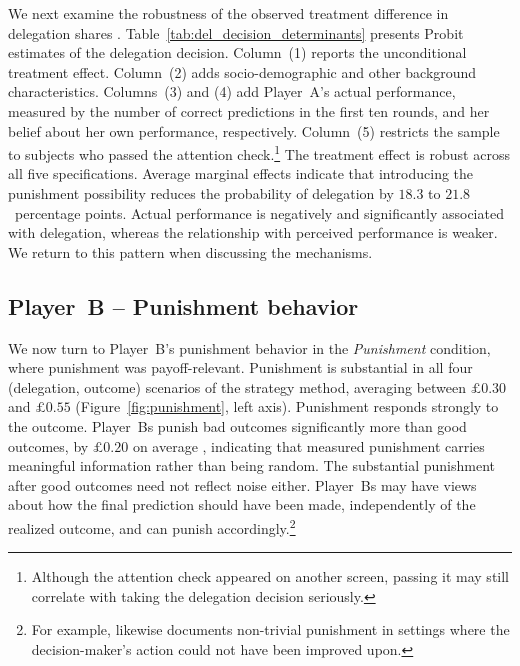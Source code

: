 We next examine the robustness of the observed treatment difference in delegation shares%
. Table~\ref{tab:del_decision_determinants} presents Probit estimates of the delegation decision. Column~(1) reports the unconditional treatment effect. Column~(2) adds socio-demographic and other background characteristics. Columns~(3) and (4) add Player~A's actual performance, measured by the number of correct predictions in the first ten rounds, and her belief about her own performance, respectively. Column~(5) restricts the sample to subjects who passed the attention check.\footnote{Although the attention check appeared on another screen, passing it may still correlate with taking the delegation decision seriously.} The treatment effect is robust across all five specifications. Average marginal effects indicate that introducing the punishment possibility reduces the probability of delegation by $18.3$ to $21.8$~percentage points. %
Actual performance is negatively and significantly associated with delegation, whereas the relationship with perceived performance is weaker. We return to this pattern when discussing the mechanisms.



\subsection*{Player~B -- Punishment behavior} \label{sec:result2}

We now turn to Player~B's punishment behavior in the \textit{Punishment} condition, where punishment was payoff-relevant. Punishment is substantial in all four (delegation, outcome) scenarios of the strategy method, averaging between $\pounds 0.30$ and $\pounds 0.55$ (Figure~\ref{fig:punishment}, left axis). Punishment responds strongly to the outcome. Player~Bs punish bad outcomes significantly more than good outcomes, by $\pounds 0.20$ on average%
, indicating that measured punishment carries meaningful information rather than being random. The substantial punishment after good outcomes need not reflect noise either. Player~Bs may have views about how the final prediction should have been made, independently of the realized outcome, and can punish accordingly.\footnote{For example, \citet{coffman_intermediation_2011} likewise documents non-trivial punishment in settings where the decision-maker's action could not have been improved upon.}

